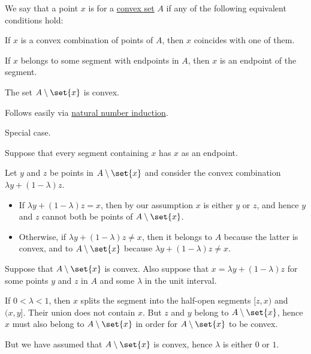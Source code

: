 \begin{definition}\label{def:extremal_point}
  We say that a point \( x \) is  for a \hyperref[def:convex_hull]{convex set} \( A \) if any of the following equivalent conditions hold:

  \begin{thmenum}
     If \( x \) is a convex combination of points of \( A \), then \( x \) coincides with one of them.

     If \( x \) belongs to some segment with endpoints in \( A \), then \( x \) is an endpoint of the segment.

     The set \( A \setminus \set{ x } \) is convex.
  \end{thmenum}
\end{definition}
\begin{defproof}
   Follows easily via \hyperref[con:induction/peano_arithmetic]{natural number induction}.

   Special case.

   Suppose that every segment containing \( x \) has \( x \) as an endpoint.

  Let \( y \) and \( z \) be points in \( A \setminus \set{ x } \) and consider the convex combination \( \lambda y + (1 - \lambda) z \).

  \begin{itemize}
    \item If \( \lambda y + (1 - \lambda) z = x \), then by our assumption \( x \) is either \( y \) or \( z \), and hence \( y \) and \( z \) cannot both be points of \( A \setminus \set{ x } \).

    \item Otherwise, if \( \lambda y + (1 - \lambda) z \neq x \), then it belongs to \( A \) because the latter is convex, and to \( A \setminus \set{ x } \) because \( \lambda y + (1 - \lambda) z \neq x \).
  \end{itemize}

   Suppose that \( A \setminus \set{ x } \) is convex. Also suppose that \( x = \lambda y + (1 - \lambda) z \) for some points \( y \) and \( z \) in \( A \) and some \( \lambda \) in the unit interval.

  If \( 0 < \lambda < 1 \), then \( x \) splits the segment into the half-open segments \( [z, x) \) and \( (x, y] \). Their union does not contain \( x \). But \( z \) and \( y \) belong to \( A \setminus \set{ x } \), hence \( x \) must also belong to \( A \setminus \set{ x } \) in order for \( A \setminus \set{ x } \) to be convex.

  But we have assumed that \( A \setminus \set{ x } \) is convex, hence \( \lambda \) is either \( 0 \) or \( 1 \).
\end{defproof}

